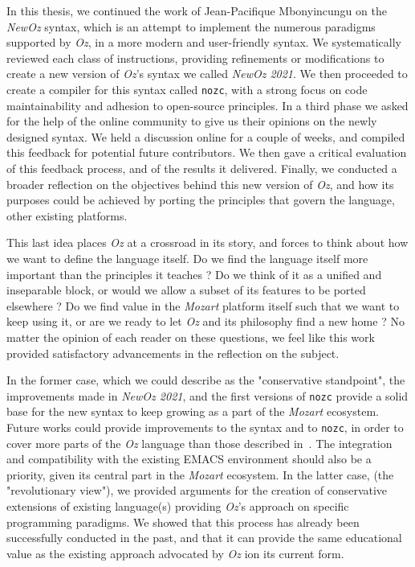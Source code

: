 In this thesis, we continued the work of Jean-Pacifique Mbonyincungu on the \textit{NewOz} syntax, which is an attempt to implement the numerous paradigms supported by \textit{Oz}, in a more modern and user-friendly syntax.
We systematically reviewed each class of instructions, providing refinements or modifications to create a new version of \textit{Oz}'s syntax we called \textit{NewOz 2021}.
We then proceeded to create a compiler for this syntax called \texttt{nozc}, with a strong focus on code maintainability and adhesion to open-source principles.
In a third phase we asked for the help of the online community to give us their opinions on the newly designed syntax.
We held a discussion online for a couple of weeks, and compiled this feedback for potential future contributors.
We then gave a critical evaluation of this feedback process, and of the results it delivered.
Finally, we conducted a broader reflection on the objectives behind this new version of \textit{Oz}, and how its purposes could be achieved by porting the principles that govern the language, other existing platforms.\newline

This last idea places \textit{Oz} at a crossroad in its story, and forces to think about how we want to define the language itself.
Do we find the language itself more important than the principles it teaches ?
Do we think of it as a unified and inseparable block, or would we allow a subset of its features to be ported elsewhere ?
Do we find value in the \textit{Mozart} platform itself such that we want to keep using it, or are we ready to let \textit{Oz} and its philosophy find a new home ?
No matter the opinion of each reader on these questions, we feel like this work provided satisfactory advancements in the reflection on the subject.\newline

In the former case, which we could describe as the "conservative standpoint", the improvements made in \textit{NewOz 2021}, and the first versions of \texttt{nozc} provide a solid base for the new syntax to keep growing as a part of the \textit{Mozart} ecosystem.
Future works could provide improvements to the syntax and to \texttt{nozc}, in order to cover more parts of the \textit{Oz} language than those described in~\cite{van2004concepts}.
The integration and compatibility with the existing EMACS environment should also be a priority, given its central part in the \textit{Mozart} ecosystem.\newline
In the latter case, (the "revolutionary view"), we provided arguments for the creation of conservative extensions of existing language(s) providing \textit{Oz}'s approach on specific programming paradigms.
We showed that this process has already been successfully conducted in the past, and that it can provide the same educational value as the existing approach advocated by \textit{Oz} ion its current form.\newline

